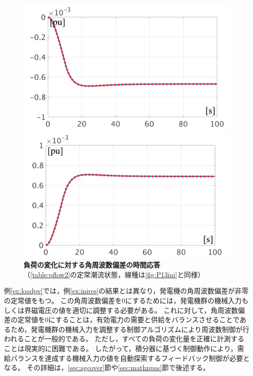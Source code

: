 \documentclass[tombow,dvipdfmx]{corona-a5-1.1}
\begin{document}
\begin{figure}[t]
  \centering
  {
  \begin{minipage}{0.49\linewidth}
    \centering
    \includegraphics[width = 1.0\linewidth]{figs/P3mi}
  \end{minipage}
  \begin{minipage}{0.49\linewidth}
    \centering
    \includegraphics[width = 1.0\linewidth]{figs/P3pl}
  \end{minipage}
  \medskip
  \caption{\textbf{負荷の変化に対する角周波数偏差の時間応答}
  \\ \centering（\ref{table:pflow2}の定常潮流状態，線種は\ref{fig:P13ini}と同様）}
  \label{fig:P3load}
  }
\medskip
\end{figure}

例\ref{ex:loadpv}では，例\ref{ex:inires}の結果とは異なり，発電機の角周波数偏差が非零の定常値をもつ。
この角周波数偏差を0にするためには，発電機群の機械入力もしくは界磁電圧の値を適切に調整する必要がある。
これに対して，角周波数偏差の定常値を0にすることは，有効電力の需要と供給をバランスさせることであるため，発電機群の機械入力を調整する制御アルゴリズムにより周波数制御が行われることが一般的である。
ただし，すべての負荷の変化量を正確に計測することは現実的に困難である。
したがって，積分器に基づく制御動作により，需給バランスを達成する機械入力の値を自動探索するフィードバック制御が必要となる。
その詳細は，\ref{sec:agcover}節や\ref{sec:mathnpas}節で後述する。
\end{document}
